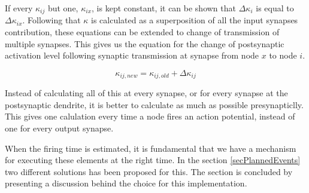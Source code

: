 	If every $\kappa_{ij}$ but one, $\kappa_{ix}$, is kept constant, it can be shown that $\Delta \kappa_i$ is equal to $\Delta \kappa_{ix}$.
	Following that $\kappa$ is calculated as a superposition of all the input synapses contribution, these equations can be extended to change of transmission of multiple synapses.
	This gives us the equation for the change of postsynaptic activation level following synaptic transmission at synapse from node $x$ to node $i$.

	\begin{equation}
		\kappa_{ij, new} = \kappa_{ij, old} + \Delta \kappa_{ij}
	\end{equation}

	Instead of calculating all of this at every synapse, or for every synapse at the postsynaptic dendrite, it is better to calculate as much as possible presynapticlly.
	This gives one calulation every time a node fires an action potential, instead of one for every output synapse.

	




	When the firing time is estimated, it is fundamental that we have a mechanism for executing these elements at the right time. 
	In the section \ref{secPlannedEvents} two different solutions has been proposed for this. 
	The section is concluded by presenting a discussion behind the choice for this implementation.



